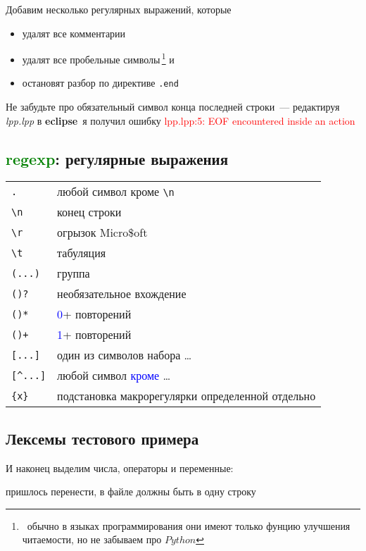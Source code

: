 \documentclass[oneside,10pt]{article}
\renewcommand{\emph}[1]{\textcolor{blue}{#1}}
\newcommand{\note}[1]{\,\footnote{\ #1}}
\newcommand{\term}[1]{\textcolor{green}{#1}}
\newcommand{\error}[1]{\textcolor{red}{#1}}
\newcommand{\py}{$Python$}
\newcommand{\prog}[1]{\textbf{#1}}
\newcommand{\file}[1]{\textit{#1}}
\newcommand{\eclipse}{\prog{eclipse}}
\newcommand{\lst}[2]{}
\begin{document}
\bigskip
Добавим несколько регулярных выражений, которые
\begin{itemize}
  \item удалят все комментарии
  \item удалят все пробельные символы\note{обычно в языках программирования они
  имеют только фунцию улучшения читаемости, но не забываем про \py} и
  \item остановят разбор по директиве \verb|.end|
\end{itemize}

\noindent
Не забудьте про обязательный символ конца последней строки\ --- редактируя
\file{lpp.lpp} в \eclipse\ я получил ошибку \error{lpp.lpp:5: EOF encountered
inside an action}

\lst{\file{lpp.lpp}: удаление лишнего}{doc/02.lpp}
\lst{\file{log.log}: остались только значащие символы}{doc/02.llg}

\subsection{\term{regexp}: регулярные выражения}

\begin{tabular}{l l}
\verb|.| & любой символ кроме \verb|\n| \\
\verb|\n| & конец строки \\
\verb|\r| & огрызок Micro\$oft \\
\verb|\t| & табуляция \\
\verb|(...)| & группа \\
\verb|()?| & необязательное вхождение \\
\verb|()*| & \emph{0}+ повторений \\
\verb|()+| & \emph{1}+ повторений \\
\verb|[...]| & один из символов набора \ldots \\
\verb|[^...]| & любой символ \emph{кроме} \ldots \\
\verb|{x}| & подстановка макрорегулярки определенной отдельно \\
\end{tabular}

\subsection{Лексемы тестового примера}

И наконец выделим числа, операторы и переменные:

\lst{\file{lpp.lpp}: полный набор \term{regexp}ов}{doc/03.lpp}
\lst{\file{lpp.lpp}: числа (несколько вариантов)}{doc/04.lpp}
пришлось перенести, в файле должны быть в одну строку
\lst{\file{log.log}: числа}{doc/04.llg}
\clearpage
\lst{\file{lpp.lpp}: имена и операторы}{doc/05.lpp}
\clearpage
\lst{\file{log.log}: имена и операторы}{doc/05.llg}
\end{document}
